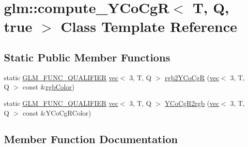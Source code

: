 \hypertarget{classglm_1_1compute___y_co_cg_r_3_01_t_00_01_q_00_01true_01_4}{}\section{glm\+:\+:compute\+\_\+\+Y\+Co\+CgR$<$ T, Q, true $>$ Class Template Reference}
\label{classglm_1_1compute___y_co_cg_r_3_01_t_00_01_q_00_01true_01_4}
\subsection*{Static Public Member Functions}
\begin{DoxyCompactItemize}
\item 
static \mbox{\hyperlink{setup_8hpp_a33fdea6f91c5f834105f7415e2a64407}{G\+L\+M\+\_\+\+F\+U\+N\+C\+\_\+\+Q\+U\+A\+L\+I\+F\+I\+ER}} \mbox{\hyperlink{structglm_1_1vec}{vec}}$<$ 3, T, Q $>$ \mbox{\hyperlink{classglm_1_1compute___y_co_cg_r_3_01_t_00_01_q_00_01true_01_4_a1cf1c142223066bbf63e906c7f426bc4}{rgb2\+Y\+Co\+CgR}} (\mbox{\hyperlink{structglm_1_1vec}{vec}}$<$ 3, T, Q $>$ const \&\mbox{\hyperlink{group__gtx__color__space_ga5f9193be46f45f0655c05a0cdca006db}{rgb\+Color}})
\item 
static \mbox{\hyperlink{setup_8hpp_a33fdea6f91c5f834105f7415e2a64407}{G\+L\+M\+\_\+\+F\+U\+N\+C\+\_\+\+Q\+U\+A\+L\+I\+F\+I\+ER}} \mbox{\hyperlink{structglm_1_1vec}{vec}}$<$ 3, T, Q $>$ \mbox{\hyperlink{classglm_1_1compute___y_co_cg_r_3_01_t_00_01_q_00_01true_01_4_aa5c06979ab1f4762a3d4528d55e9655d}{Y\+Co\+Cg\+R2rgb}} (\mbox{\hyperlink{structglm_1_1vec}{vec}}$<$ 3, T, Q $>$ const \&Y\+Co\+Cg\+R\+Color)
\end{DoxyCompactItemize}


\subsection{Member Function Documentation}
\mbox{\label{classglm_1_1compute___y_co_cg_r_3_01_t_00_01_q_00_01true_01_4_a1cf1c142223066bbf63e906c7f426bc4}} 
